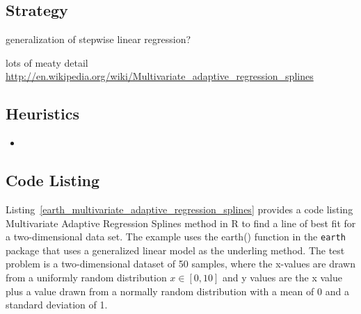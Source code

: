 \subsection{Strategy}

generalization of stepwise linear regression?

lots of meaty detail \url{http://en.wikipedia.org/wiki/Multivariate_adaptive_regression_splines}

\subsection{Heuristics}

\begin{itemize}
	\item 
\end{itemize}

\subsection{Code Listing}
Listing~\ref{earth_multivariate_adaptive_regression_splines} provides a code listing Multivariate Adaptive Regression Splines method in R to find a line of best fit for a two-dimensional data set.
The example uses the {earth()} function in the \texttt{earth} package that uses a generalized linear model as the underling method.
The test problem is a two-dimensional dataset of 50 samples, where the x-values are drawn from a uniformly random distribution $x \in [0,10]$ and y values are the x value plus a value drawn from a normally random distribution with a mean of 0 and a standard deviation of 1.



